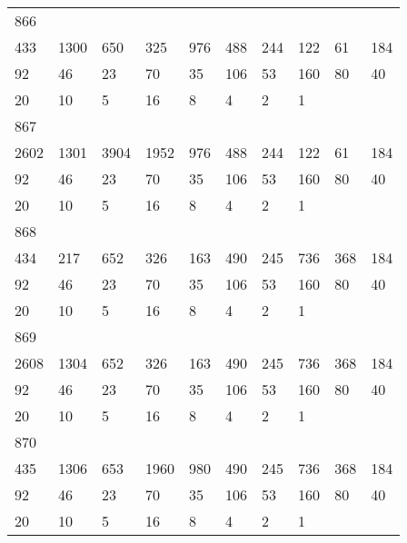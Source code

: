 \begin{longtable}{*{10}{l}}
866&&&&&&&&&\\
433& 1300& 650& 325& 976& 488& 244& 122& 61& 184\\
92& 46& 23& 70& 35& 106& 53& 160& 80& 40\\
20& 10& 5& 16& 8& 4& 2& 1& \\

867&&&&&&&&&\\
2602& 1301& 3904& 1952& 976& 488& 244& 122& 61& 184\\
92& 46& 23& 70& 35& 106& 53& 160& 80& 40\\
20& 10& 5& 16& 8& 4& 2& 1& \\

868&&&&&&&&&\\
434& 217& 652& 326& 163& 490& 245& 736& 368& 184\\
92& 46& 23& 70& 35& 106& 53& 160& 80& 40\\
20& 10& 5& 16& 8& 4& 2& 1& \\

869&&&&&&&&&\\
2608& 1304& 652& 326& 163& 490& 245& 736& 368& 184\\
92& 46& 23& 70& 35& 106& 53& 160& 80& 40\\
20& 10& 5& 16& 8& 4& 2& 1& \\

870&&&&&&&&&\\
435& 1306& 653& 1960& 980& 490& 245& 736& 368& 184\\
92& 46& 23& 70& 35& 106& 53& 160& 80& 40\\
20& 10& 5& 16& 8& 4& 2& 1& \\


\end{longtable}
